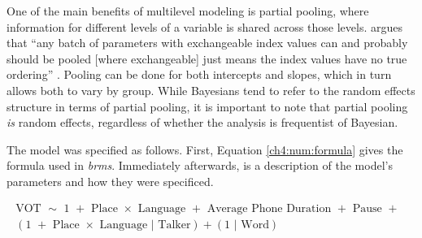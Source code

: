 One of the main benefits of multilevel modeling is partial pooling, where information for different levels of a variable is shared across those levels. \citeauthor{mcelreath_2020_sr} argues that ``any batch of parameters with exchangeable index values can and probably should be pooled [where exchangeable] just means the index values have no true ordering'' \citeyearpar[][p. 435]{mcelreath_2020_sr}. Pooling can be done for both intercepts and slopes, which in turn allows both to vary by group. While Bayesians tend to refer to the random effects structure in terms of partial pooling, it is important to note that partial pooling \textit{is} random effects, regardless of whether the analysis is frequentist of Bayesian. 

The model was specified as follows. First, Equation \ref{ch4:num:formula} gives the formula used in \textit{brms}. Immediately afterwards, is a description of the model's parameters and how they were specificed. 

\begin{equation}
  \begin{aligned}\label{ch4:num:formula}
    \text{VOT } \sim \text{ 1 } + \text{ Place } \times \text{ Language } + \text{ Average Phone Duration } + \text{ Pause } + \text{ } \\
    (\text{1 } + \text{ Place } \times \text{ Language }|\text{ Talker}) + (\text{1 }| \text{ Word})
  \end{aligned}
\end{equation} 
\newline

